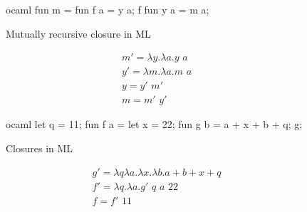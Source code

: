 \documentclass[11pt]{article}
\begin{document}
    \begin{figure}[htp]
        \centering
        \begin{cminted}{ocaml}
fun m =
    fun f a = y a;
    f
fun y a = m a;
        \end{cminted}
        \caption{Mutually recursive closure in ML}
        \label{lst:mutually_recursive_curried}
    \end{figure}
    \begin{gather}
        m' = \lambda y. \lambda a. y \,\, a \nonumber \\
        y' = \lambda m. \lambda a. m \,\, a \nonumber \\
        y = y' \,\, m' \nonumber \\
        m = m' \,\, y'
    \end{gather}
    \begin{figure}[htp]
        \centering
        \begin{cminted}{ocaml}
let q = 11;
fun f a =
    let x = 22;
    fun g b = a + x + b + q;
    g;
        \end{cminted}
        \caption{Closures in ML}
        \label{lst:closures}
    \end{figure}
    \begin{gather}
        g' = \lambda q \lambda a. \lambda x. \lambda b. a + b + x + q \nonumber \\
        f' = \lambda q. \lambda a. g' \,\, q \,\, a \,\, 22 \nonumber \\
        f = f' \,\, 11
    \end{gather}
\end{document}
